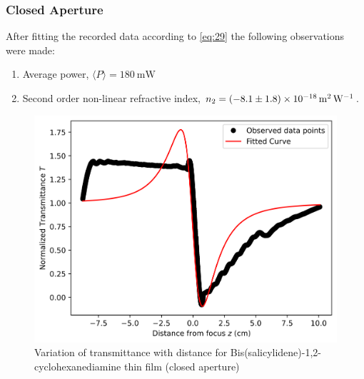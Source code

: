 \documentclass[%
 reprint,
 amsmath,amssymb,
 aps,
]{revtex4-2}
\begin{document}
		\subsubsection{Closed Aperture}
		After fitting the recorded data according to \eqref{eq:29} the following observations were made:
		\begin{enumerate} 
			\item Average power, $ \langle P \rangle  = \SI{180}{\milli \watt}$
			\item Second order non-linear refractive index, $ n_2 = \SI[separate-uncertainty=true]{-8.1 \pm 1.8e-18}{\meter \squared \per \watt} $.
		\end{enumerate}
		\begin{figure}
			\includegraphics[scale = 0.59]{org-c}
			\caption{Variation of transmittance with distance for Bis(salicylidene)-1,2-cyclohexanediamine thin film (closed aperture)}
		\end{figure}
		
\end{document}

